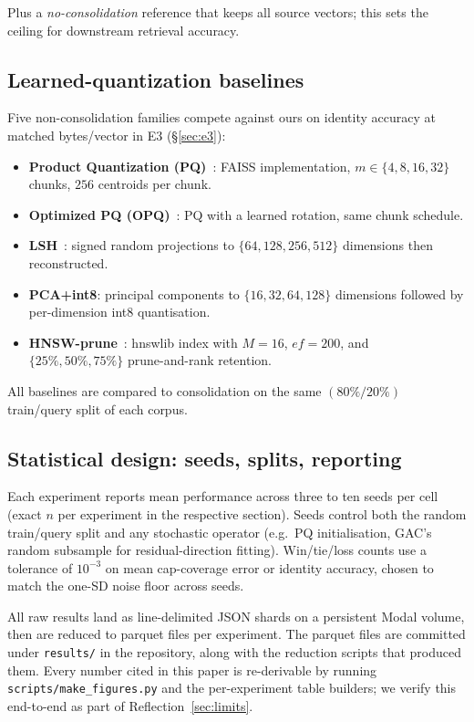 Plus a \emph{no-consolidation} reference that keeps all source vectors;
this sets the ceiling for downstream retrieval accuracy.

\subsection{Learned-quantization baselines}
\label{sec:experiments:quantization}

Five non-consolidation families compete against ours on identity
accuracy at matched bytes/vector in E3 (\S\ref{sec:e3}):

\begin{itemize}[leftmargin=1.8em, itemsep=2pt]
\item \textbf{Product Quantization (PQ)}~\cite{jegouPQ2011}: FAISS
implementation, $m \in \{4, 8, 16, 32\}$ chunks, $256$ centroids per
chunk.
\item \textbf{Optimized PQ (OPQ)}~\cite{ge2013optimized}: PQ with a
learned rotation, same chunk schedule.
\item \textbf{LSH}~\cite{charikarLSH2002}: signed random projections to
$\{64, 128, 256, 512\}$ dimensions then reconstructed.
\item \textbf{PCA+int8}: principal components to $\{16, 32, 64, 128\}$
dimensions followed by per-dimension int8 quantisation.
\item \textbf{HNSW-prune}~\cite{malkovHNSW2018}: hnswlib index with
$M = 16$, $ef = 200$, and $\{25\%, 50\%, 75\%\}$ prune-and-rank
retention.
\end{itemize}

All baselines are compared to consolidation on the same $(80\%/20\%)$
train/query split of each corpus.

\subsection{Statistical design: seeds, splits, reporting}
\label{sec:experiments:stats}

Each experiment reports mean performance across three to ten seeds per
cell (exact $n$ per experiment in the respective section). Seeds control
both the random train/query split and any stochastic operator (e.g.\ PQ
initialisation, GAC's random subsample for residual-direction fitting).
Win/tie/loss counts use a tolerance of $10^{-3}$ on mean cap-coverage
error or identity accuracy, chosen to match the one-SD noise floor
across seeds.

All raw results land as line-delimited JSON shards on a persistent Modal
volume, then are reduced to parquet files per experiment. The parquet
files are committed under \texttt{results/} in the repository, along
with the reduction scripts that produced them. Every number cited in
this paper is re-derivable by running \texttt{scripts/make\_figures.py}
and the per-experiment table builders; we verify this end-to-end as part
of Reflection~\ref{sec:limits}.

